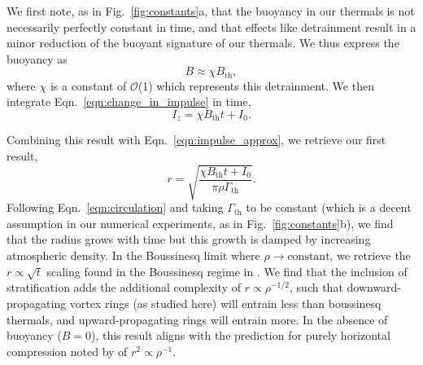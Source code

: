 \documentclass[twocolumn, amsmath, amsfonts, amssymb, trackchanges]{aastex62}
\newcommand{\LJ}{\citetalias{lecoanet&jeevanjee2018}}
\begin{document}
We first note, as in Fig.~\ref{fig:constants}a, that the buoyancy in our thermals is not necessarily perfectly constant in time, and that effects like detrainment result in a minor reduction of the buoyant signature of our thermals. 
We thus express the buoyancy as 
\begin{equation}
B \approx \chi B_{\text{th}},
\end{equation}
where $\chi$ is a constant of $\mathcal{O}$(1) which represents this detrainment. 
We then integrate Eqn.~\ref{eqn:change_in_impulse} in time,
\begin{equation*}
I_z = \chi B_{\text{th}} t + I_0.
\end{equation*}

Combining this result with Eqn.~\ref{eqn:impulse_approx}, we retrieve our first result,
\begin{equation}
r = \sqrt{\frac{\chi B_{\text{th}} t + I_0}{\pi\rho\Gamma_{\text{th}}}}.
\label{eqn:r_theory}
\end{equation}
Following Eqn.~\ref{eqn:circulation} and taking $\Gamma_{\text{th}}$ to be constant (which is a decent assumption in our numerical experiments, as in Fig.~\ref{fig:constants}b), we find that the radius grows with time but this growth is damped by increasing atmospheric density.
In the Boussinesq limit where $\rho \rightarrow \text{constant}$, we retrieve the $r \propto \sqrt{t}$ scaling found in the Boussinesq regime in \LJ. 
We find that the inclusion of stratification adds the additional complexity of $r \propto \rho^{-1/2}$, such that downward-propagating vortex rings (as studied here) will entrain less than boussinesq thermals, and upward-propagating rings will entrain more. 
In the absence of buoyancy ($B = 0$), this result aligns with the prediction for purely horizontal compression noted by \citet{brandenburg2016} of $r^2 \propto \rho^{-1}$.
\end{document}
